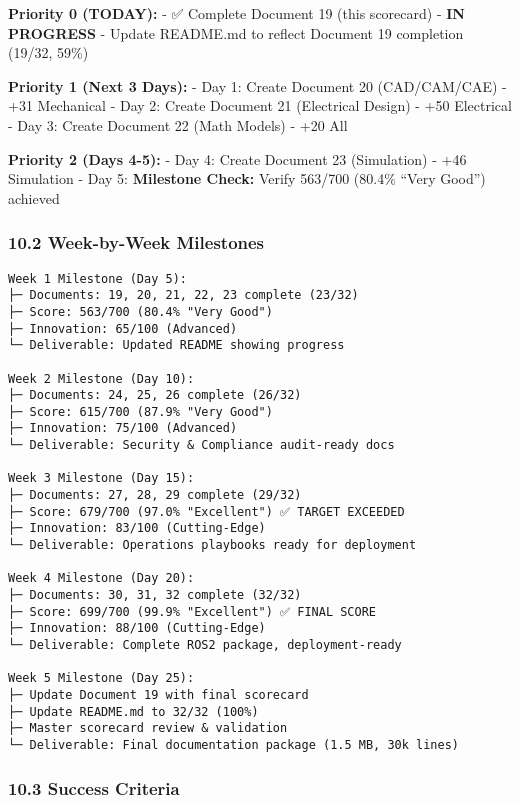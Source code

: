 \documentclass[
]{article}
\begin{document}
\textbf{Priority 0 (TODAY):} - ✅ Complete Document 19 (this scorecard)
- \textbf{IN PROGRESS} - Update README.md to reflect Document 19
completion (19/32, 59\%)

\textbf{Priority 1 (Next 3 Days):} - Day 1: Create Document 20
(CAD/CAM/CAE) - +31 Mechanical - Day 2: Create Document 21 (Electrical
Design) - +50 Electrical - Day 3: Create Document 22 (Math Models) - +20
All

\textbf{Priority 2 (Days 4-5):} - Day 4: Create Document 23 (Simulation)
- +46 Simulation - Day 5: \textbf{Milestone Check:} Verify 563/700
(80.4\% ``Very Good'') achieved

\hypertarget{week-by-week-milestones}{%
\subsubsection{10.2 Week-by-Week
Milestones}\label{week-by-week-milestones}}

\begin{verbatim}
Week 1 Milestone (Day 5):
├─ Documents: 19, 20, 21, 22, 23 complete (23/32)
├─ Score: 563/700 (80.4% "Very Good")
├─ Innovation: 65/100 (Advanced)
└─ Deliverable: Updated README showing progress

Week 2 Milestone (Day 10):
├─ Documents: 24, 25, 26 complete (26/32)
├─ Score: 615/700 (87.9% "Very Good")
├─ Innovation: 75/100 (Advanced)
└─ Deliverable: Security & Compliance audit-ready docs

Week 3 Milestone (Day 15):
├─ Documents: 27, 28, 29 complete (29/32)
├─ Score: 679/700 (97.0% "Excellent") ✅ TARGET EXCEEDED
├─ Innovation: 83/100 (Cutting-Edge)
└─ Deliverable: Operations playbooks ready for deployment

Week 4 Milestone (Day 20):
├─ Documents: 30, 31, 32 complete (32/32)
├─ Score: 699/700 (99.9% "Excellent") ✅ FINAL SCORE
├─ Innovation: 88/100 (Cutting-Edge)
└─ Deliverable: Complete ROS2 package, deployment-ready

Week 5 Milestone (Day 25):
├─ Update Document 19 with final scorecard
├─ Update README.md to 32/32 (100%)
├─ Master scorecard review & validation
└─ Deliverable: Final documentation package (1.5 MB, 30k lines)
\end{verbatim}

\hypertarget{success-criteria}{%
\subsubsection{10.3 Success Criteria}\label{success-criteria}}
\end{document}
